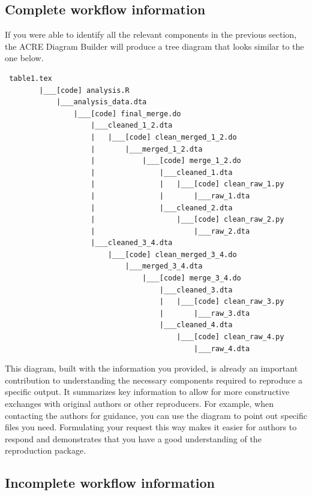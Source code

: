 \documentclass[]{book}
\begin{document}
\hypertarget{complete-workflow-information}{%
\subsection{Complete workflow information}\label{complete-workflow-information}}

If you were able to identify all the relevant components in the previous section, the ACRE Diagram Builder will produce a tree diagram that looks similar to the one below.

\begin{verbatim}
 table1.tex
        |___[code] analysis.R
            |___analysis_data.dta
                |___[code] final_merge.do
                    |___cleaned_1_2.dta
                    |   |___[code] clean_merged_1_2.do
                    |       |___merged_1_2.dta
                    |           |___[code] merge_1_2.do
                    |               |___cleaned_1.dta
                    |               |   |___[code] clean_raw_1.py
                    |               |       |___raw_1.dta
                    |               |___cleaned_2.dta
                    |                   |___[code] clean_raw_2.py
                    |                       |___raw_2.dta
                    |___cleaned_3_4.dta
                        |___[code] clean_merged_3_4.do
                            |___merged_3_4.dta
                                |___[code] merge_3_4.do
                                    |___cleaned_3.dta
                                    |   |___[code] clean_raw_3.py
                                    |       |___raw_3.dta
                                    |___cleaned_4.dta
                                        |___[code] clean_raw_4.py
                                            |___raw_4.dta
\end{verbatim}

This diagram, built with the information you provided, is already an important contribution to understanding the necessary components required to reproduce a specific output. It summarizes key information to allow for more constructive exchanges with original authors or other reproducers. For example, when contacting the authors for guidance, you can use the diagram to point out specific files you need. Formulating your request this way makes it easier for authors to respond and demonstrates that you have a good understanding of the reproduction package.

\hypertarget{incomplete-workflow-information}{%
\subsection{Incomplete workflow information}\label{incomplete-workflow-information}}
\end{document}
